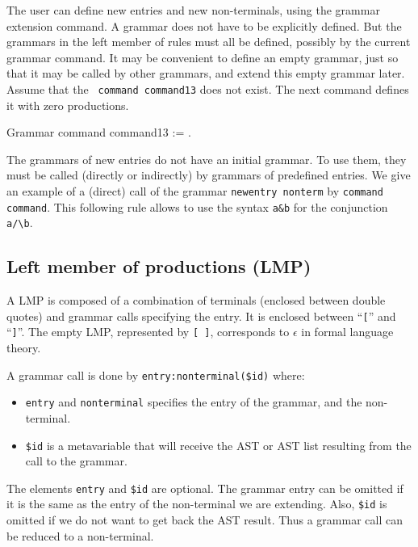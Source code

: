 The user can define new entries and new non-terminals, using the
grammar extension command. A grammar does not have to be explicitly
defined. But the grammars in the left member of rules must all be
defined, possibly by the current grammar command. It may be convenient
to define an empty grammar, just so that it may be called by other
grammars, and extend this empty grammar later.  Assume that the {\tt
command command13} does not exist. The next command defines it with
zero productions.

\begin{coq_example*}
Grammar command command13 := .
\end{coq_example*}

The grammars of new entries do not have an initial grammar. To use
them, they must be called (directly or indirectly) by grammars of
predefined entries. We give an example of a (direct) call of the
grammar {\tt newentry nonterm} by {\tt command command}.  This
following rule allows to use the syntax \verb+a&b+ for the conjunction
\verb+a/\b+.



\subsection{Left member of productions (LMP)}

A LMP is composed of a combination of terminals (enclosed between
double quotes) and grammar calls specifying the entry. It is enclosed
between ``\verb+[+'' and ``\verb+]+''. The empty LMP, represented by
\verb+[ ]+, corresponds to $\epsilon$ in formal language theory.

A grammar call is done by \verb+entry:nonterminal($id)+ where:
\begin{itemize}
\item \verb+entry+ and \verb+nonterminal+ 
  specifies the entry of the grammar, and the non-terminal.
\item \verb+$id+ is a metavariable that will receive the AST or AST
  list resulting from the call to the grammar.
\end{itemize}

The elements \verb+entry+ and \verb+$id+ are optional. The grammar
entry can be omitted if it is the same as the entry of the
non-terminal we are extending. Also, \verb+$id+ is omitted if we do
not want to get back the AST result. Thus a grammar call can be
reduced to a non-terminal.

